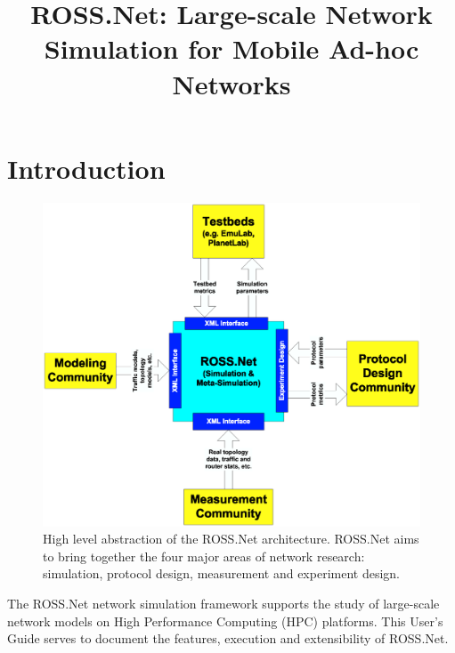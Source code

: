 \documentclass[conference,onecolumn]{IEEEtran}
\begin{document}
\title{ROSS.Net: Large-scale Network Simulation for Mobile Ad-hoc Networks}

 \author{
 \and
 }

\maketitle

\section{Introduction}

\begin{figure}[!h]
\centering
\includegraphics[width=5in]{rn_combines.ps}
\caption{High level abstraction of the ROSS.Net architecture.  ROSS.Net aims to bring together the four major areas of network research: simulation, protocol design, measurement and experiment design.}
\label{fig-rn-arch}
\end{figure}

The ROSS.Net network simulation framework supports the study of large-scale network models on High Performance Computing (HPC) platforms.  This User's Guide serves to document the features, execution and extensibility of ROSS.Net.
\end{document}
